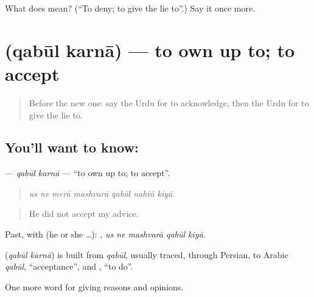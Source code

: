 \begin{tcolorbox}[breakable,colback=teal!4,colframe=teal!35!black,title={Before you move on}]
What does  mean? (\textquotedblleft{}To deny; to give the lie to\textquotedblright{}.) Say it once more.
\end{tcolorbox}
\section[\texorpdfstring{\ur{قبول} \ur{کرنا} (qabūl karnā)}{قبول کرنا (qabūl karnā)}]{  (qabūl karnā) — to own up to; to accept}

\label{lesson:UR-C337-qabul-karna}



\begin{quote}
Before the new one: say the Urdu for to acknowledge, then the Urdu for to give the lie to.
\end{quote}

\subsection*{You'll want to know:  }
\textbf{ } — \emph{qabūl karnā} — \textquotedblleft{}to own up to; to accept\textquotedblright{}.

\begin{quote}
      
\end{quote}

\begin{quote}
\emph{us ne merā mashvarā qabūl nahīṅ kiyā.}
\end{quote}

\begin{quote}
He did not accept my advice.
\end{quote}

Past, with  (he or she …):     , \emph{us ne mashvarā qabūl kiyā}.

\begin{cousinweb}
\textbf{ } (\emph{qabūl karnā}) is built from \emph{qabūl}, usually traced, through Persian, to Arabic \emph{qabūl}, \textquotedblleft{}acceptance\textquotedblright{}, and \textbf{}, \textquotedblleft{}to do\textquotedblright{}.
\end{cousinweb}

\begin{grammarlens}[title={What you've built}]
One more word for giving reasons and opinions.
\end{grammarlens}

